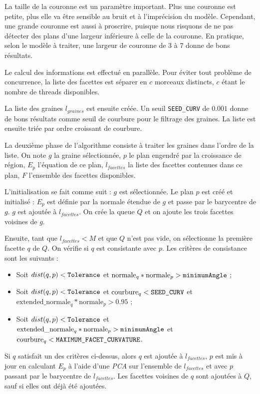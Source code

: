 ﻿\documentclass[12pt, twoside]{article}
\begin{document}
La taille de la couronne est un paramètre important. Plus une couronne est petite, plus elle va être sensible au bruit et à l'imprécision du modèle. Cependant, une grande couronne est aussi à proscrire, puisque nous risquons de ne pas détecter des plans d'une largeur inférieure à celle de la couronne. En pratique, selon le modèle à traiter, une largeur de couronne de 3 à 7 donne de bons résultats.

Le calcul des informations est effectué en parallèle. Pour éviter tout problème de concurrence, la liste des facettes est séparer en $c$ morceaux distincts, $c$ étant le nombre de threads disponibles.

La liste des graines $l_{graines}$ est ensuite créée. Un seuil \texttt{SEED\_CURV} de $0.001$ donne de bons résultats comme seuil de courbure pour le filtrage des graines. La liste est ensuite triée par ordre croissant de courbure.

La deuxième phase de l'algorithme consiste à traiter les graines dans l'ordre de la liste. On note $g$ la graine sélectionnée, $p$ le plan engendré par la croissance de région, $E_p$ l'équation de ce plan, $l_{facettes}$ la liste des facettes contenues dans ce plan, $F$ l'ensemble des facettes disponibles.

L'initialisation se fait comme suit : $g$ est sélectionnée. Le plan $p$ est créé et initialisé : $E_p$ est définie par la normale étendue de $g$ et passe par le barycentre de $g$. $g$ est ajoutée à $l_{facettes}$. On crée la queue $Q$ et on ajoute les trois facettes voisines de $g$.

Ensuite, tant que $l_{facettes} < M$ et que $Q$ n'est pas vide, on sélectionne la première facette $q$ de $Q$. On vérifie si $q$ est consistante avec $p$. Les critères de consistance sont les suivants :
\begin{itemize}
  \item Soit $dist(q, p) < \text{\texttt{Tolerance}}$ et $\text{normale}_q * \text{normale}_p > \text{\texttt{minimumAngle}}$ ;
  \item Soit $dist(q, p) < \text{\texttt{Tolerance}}$ et $\text{courbure}_q < \text{\texttt{SEED\_CURV}}$ et $\text{extended\_normale}_q * \text{normale}_p > 0.95$ ;
  \item Soit $dist(q, p) < \text{\texttt{Tolerance}}$ et $\text{extended\_normale}_q * \text{normale}_p > \text{\texttt{minimumAngle}}$ et $\text{courbure}_q < \text{\texttt{MAXIMUM\_FACET\_CURVATURE}}$.
\end{itemize}
Si $q$ satisfait un des critères ci-dessus, alors $q$ est ajoutée à $l_{facettes}$, $p$ est mis à jour en calculant $E_p$ à l'aide d'une \textit{PCA} sur l'ensemble de $l_{facettes}$ et avec $p$ passant par le barycentre de $l_{facettes}$. Les facettes voisines de $q$ sont ajoutées à $Q$, sauf si elles ont déjà été ajoutées.
\end{document}
